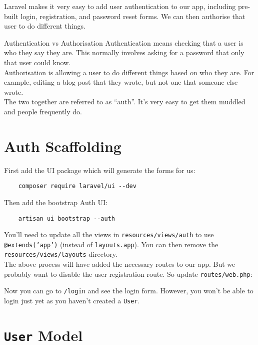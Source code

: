 Laravel makes it very easy to add user authentication to our app, including pre-built login, registration, and password reset forms. We can then authorise that user to do different things.


\begin{infobox}{Authentication vs Authorisation}
    Authentication means checking that a user is who they say they are. This normally involves asking for a password that only that user could know.
    \\

    Authorisation is allowing a user to do different things based on who they are. For example, editing a blog post that they wrote, but not one that someone else wrote.
    \\

    The two together are referred to as ``auth''. It's very easy to get them muddled and people frequently do.
\end{infobox}


\section{Auth Scaffolding}

First add the UI package which will generate the forms for us:

\begin{verbatim}
    composer require laravel/ui --dev
\end{verbatim}

Then add the bootstrap Auth UI:

\begin{verbatim}
    artisan ui bootstrap --auth
\end{verbatim}

You'll need to update all the views in \texttt{resources/views/auth} to use \texttt{@extends('app')} (instead of \texttt{layouts.app}). You can then remove the \texttt{resources/views/layouts} directory.
\\

The above process will have added the necessary routes to our app. But we probably want to disable the user registration route. So update \texttt{routes/web.php}:


Now you can go to \texttt{/login} and see the login form. However, you won't be able to login just yet as you haven't created a \texttt{User}.


\section{\texttt{User} Model}

